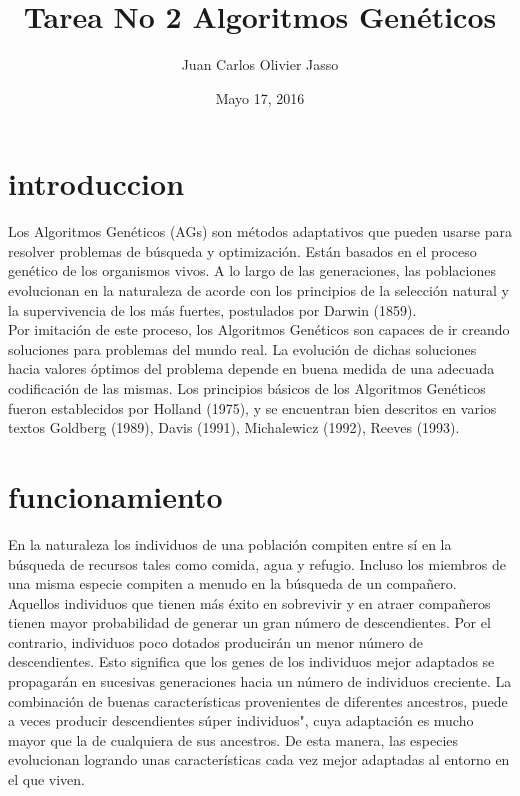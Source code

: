 \documentclass[11pt]{article}
\title{\textbf{Tarea No 2 Algoritmos Genéticos }}
\author{Juan Carlos Olivier Jasso}
\date{Mayo 17, 2016}
\begin{document}
\maketitle



\section {introduccion}


Los Algoritmos Genéticos (AGs) son métodos adaptativos que pueden usarse para resolver problemas de búsqueda y optimización. Están basados en el proceso genético de los organismos vivos. A lo largo de las generaciones, las poblaciones evolucionan en la naturaleza de acorde con los principios de la selección natural y la supervivencia de los más fuertes, postulados por Darwin (1859).\\

Por imitación de este proceso, los Algoritmos Genéticos son capaces de ir creando soluciones para
problemas del mundo real. La evolución de dichas soluciones hacia valores óptimos del problema depende en buena medida de una adecuada codificación de las mismas.  Los principios básicos de los Algoritmos Genéticos fueron establecidos por Holland (1975), y se encuentran bien descritos en varios textos Goldberg (1989), Davis (1991), Michalewicz (1992), Reeves (1993). \\

\newpage
\section{funcionamiento}

En la naturaleza los individuos de una población compiten entre sí en la búsqueda de recursos tales como comida, agua y refugio. Incluso los miembros de una misma especie compiten a menudo en la búsqueda de un compañero. Aquellos individuos que tienen más éxito en sobrevivir y en atraer compañeros tienen mayor probabilidad de generar un gran número de descendientes. Por el contrario, individuos poco dotados producirán un menor número de descendientes. Esto significa que los genes de los individuos mejor adaptados se propagarán en sucesivas generaciones hacia un número de individuos creciente. La combinación de buenas características provenientes de diferentes ancestros, puede a veces producir descendientes súper individuos", cuya adaptación es mucho mayor que la de cualquiera de sus ancestros. De esta manera, las especies evolucionan logrando unas características cada vez mejor adaptadas al entorno en el que viven.\\
\end{document}
